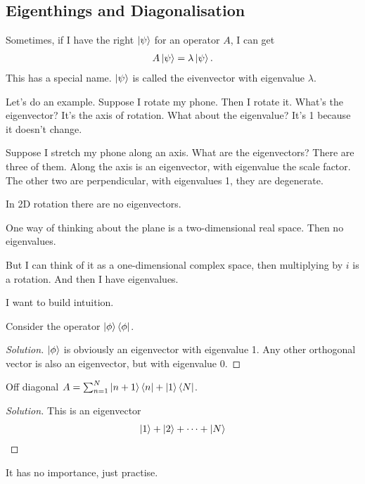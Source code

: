 \subsection{Eigenthings and Diagonalisation}
Sometimes, if I have the right $\ket{\psi}$ for an operator $A$,
I can get
\begin{align}
    A\ket{\psi} = \lambda\ket{\psi}.
\end{align}
This has a special name.
$\ket{\psi}$ is called the eivenvector with eigenvalue $\lambda$.

Let's do an example.
Suppose I rotate my phone.
Then I rotate it.
What's the eigenvector?
It's the axis of rotation.
What about the eigenvalue?
It's 1 because it doesn't change.

Suppose I stretch my phone along an axis.
What are the eigenvectors?
There are three of them.
Along the axis is an eigenvector, with eigenvalue the scale factor.
The other two are perpendicular, with eigenvalues 1, they are degenerate.

In 2D rotation there are no eigenvectors.

One way of thinking about the plane is a two-dimensional real space.
Then no eigenvalues.

But I can think of it as a one-dimensional complex space,
then multiplying by $i$ is a rotation.
And then I have eigenvalues.

I want to build intuition.

\begin{example}
    Consider the operator $\ket{\phi}\bra{\phi}$.
\end{example}
\begin{proof}[Solution]
    $\ket{\phi}$ is obviously an eigenvector with eigenvalue 1.
    Any other orthogonal vector is also an eigenvector,
    but with eigenvalue 0.
\end{proof}

\begin{example}
    Off diagonal $A=\sum_{n=1}^{N}\ket{n + 1}\bra{n} + \ket{1}\bra{N}$.
\end{example}
\begin{proof}[Solution]
    This is an eigenvector
    \begin{align}
        \ket{1} + \ket{2} + \cdots + \ket{N}
    \end{align}
\end{proof}
It has no importance, just practise.

